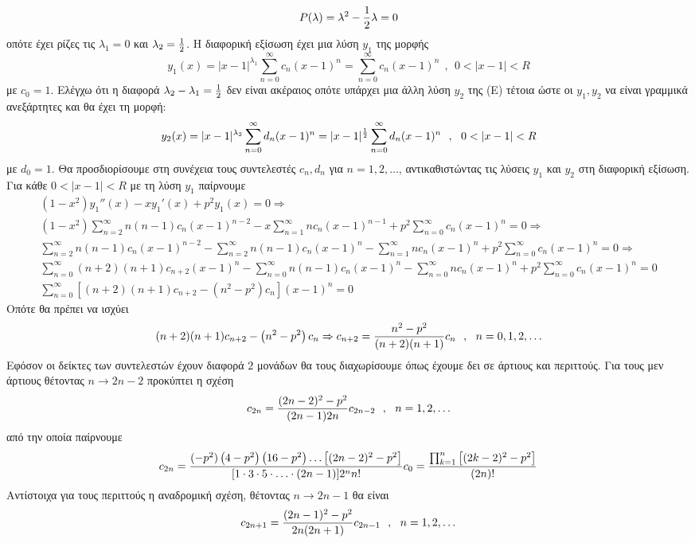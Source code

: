 \documentclass[a4paper,twoside,11pt]{book}
\DeclareRobustCommand{\frac}[3][0pt]{%
{\begingroup\hspace{#1}#2\hspace{#1}\endgroup\over\hspace{#1}#3\hspace{#1}}}
\begin{document}
\[ P(\lambda)=\lambda^2-\frac{1}{2}\lambda=0 \]
οπότε έχει ρίζες τις $ \lambda_1=0 $ και $ \lambda_2=\frac{1}{2} $. Η διαφορική εξίσωση έχει μια λύση $ y_1 $ της μορφής
\[ y_1(x)=|x-1|^{\lambda_1}\sum_{n=0}^{\infty}{c_n(x-1)^n}=\sum_{n=0}^{\infty}{c_n(x-1)^n}\ \ ,\ \ 0<|x-1|<R \]
με $ c_0=1 $. Ελέγχω ότι η διαφορά $ \lambda_2-\lambda_1=\frac{1}{2} $ δεν είναι ακέραιος οπότε υπάρχει μια άλλη λύση $ y_2 $ της (Ε) τέτοια ώστε οι $ y_1,y_2 $ να είναι γραμμικά ανεξάρτητες και θα έχει τη μορφή:
\[ y_2(x)=|x-1|^{\lambda_2}\sum_{n=0}^{\infty}{d_n(x-1)^n}=|x-1|^{\frac{1}{2}}\sum_{n=0}^{\infty}{d_n(x-1)^n}\ \ ,\ \ 0<|x-1|<R \]
με $ d_0=1 $. Θα προσδιορίσουμε στη συνέχεια τους συντελεστές $ c_n,d_n $ για $ n=1,2,\ldots $, αντικαθιστώντας τις λύσεις $ y_1 $ και $ y_2 $ στη διαφορική εξίσωση. Για κάθε $ 0<|x-1|<R $ με τη λύση $ y_1 $ παίρνουμε
\begin{gather*}
\left(1-x^2\right)y_1''(x)-xy_1'(x)+p^2y_1(x)=0\Rightarrow\\
\left(1-x^2\right)\sum_{n=2}^{\infty}{n(n-1)c_n(x-1)^{n-2}}-x\sum_{n=1}^{\infty}{nc_n(x-1)^{n-1}}+p^2\sum_{n=0}^{\infty}{c_n(x-1)^n}=0\Rightarrow\\
\sum_{n=2}^{\infty}{n(n-1)c_n(x-1)^{n-2}}-\sum_{n=2}^{\infty}{n(n-1)c_n(x-1)^{n}}-\sum_{n=1}^{\infty}{nc_n(x-1)^n}+p^2\sum_{n=0}^{\infty}{c_n(x-1)^n}=0\Rightarrow\\
\sum_{n=0}^{\infty}{(n+2)(n+1)c_{n+2}(x-1)^{n}}-\sum_{n=0}^{\infty}{n(n-1)c_n(x-1)^n}-\sum_{n=0}^{\infty}{nc_n(x-1)^n}+p^2\sum_{n=0}^{\infty}{c_n(x-1)^n}=0\\
\sum_{n=0}^{\infty}{[(n+2)(n+1)c_{n+2}-\left(n^2-p^2\right)c_n](x-1)^n}=0
\end{gather*}
Οπότε θα πρέπει να ισχύει
\[ (n+2)(n+1)c_{n+2}-\left(n^2-p^2\right)c_n\Rightarrow c_{n+2}=\frac{n^2-p^2}{(n+2)(n+1)}c_n\ \ ,\ \ n=0,1,2,\ldots \]
Εφόσον οι δείκτες των συντελεστών έχουν διαφορά $ 2 $ μονάδων θα τους διαχωρίσουμε όπως έχουμε δει σε άρτιους και περιττούς. Για τους μεν άρτιους θέτοντας $ n\to 2n-2 $ προκύπτει η σχέση
\[ c_{2n}=\frac{(2n-2)^2-p^2}{(2n-1)2n}c_{2n-2}\ \ ,\ \ n=1,2,\ldots \]
από την οποία παίρνουμε
\[ c_{2n}=\frac{(-p^2)\left(4-p^2\right)\left(16-p^2\right)\ldots\left[(2n-2)^2-p^2\right]}{[1\cdot 3\cdot 5\cdot \ldots\cdot(2n-1)]2^nn!}c_0=\frac{\prod_{k=1}^{n}{\left[(2k-2)^2-p^2\right]}}{(2n)!} \]
Αντίστοιχα για τους περιττούς η αναδρομική σχέση, θέτοντας $ n\to 2n-1 $ θα είναι
\begin{equation}\label{c8:syntart}
c_{2n+1}=\frac{(2n-1)^2-p^2}{2n(2n+1)}c_{2n-1}\ \ ,\ \ n=1,2,\ldots
\end{equation}
\end{document}
